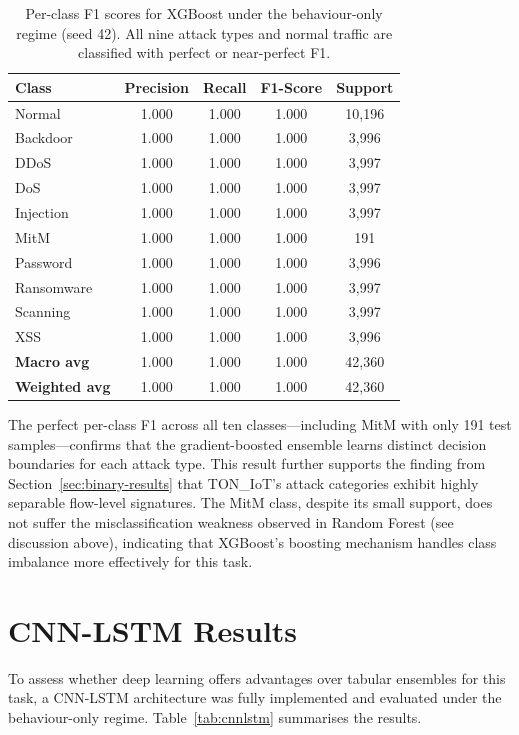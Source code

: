 \documentclass[12pt,a4paper]{report}
\begin{document}
\begin{table}[H]
\centering
\caption{Per-class F1 scores for XGBoost under the behaviour-only regime (seed 42). All nine attack types and normal traffic are classified with perfect or near-perfect F1.}
\label{tab:perclass-f1}
\begin{tabular}{lcccc}
\toprule
\textbf{Class} & \textbf{Precision} & \textbf{Recall} & \textbf{F1-Score} & \textbf{Support} \\
\midrule
Normal & 1.000 & 1.000 & 1.000 & 10,196 \\
Backdoor & 1.000 & 1.000 & 1.000 & 3,996 \\
DDoS & 1.000 & 1.000 & 1.000 & 3,997 \\
DoS & 1.000 & 1.000 & 1.000 & 3,997 \\
Injection & 1.000 & 1.000 & 1.000 & 3,997 \\
MitM & 1.000 & 1.000 & 1.000 & 191 \\
Password & 1.000 & 1.000 & 1.000 & 3,996 \\
Ransomware & 1.000 & 1.000 & 1.000 & 3,997 \\
Scanning & 1.000 & 1.000 & 1.000 & 3,997 \\
XSS & 1.000 & 1.000 & 1.000 & 3,996 \\
\midrule
\textbf{Macro avg} & 1.000 & 1.000 & 1.000 & 42,360 \\
\textbf{Weighted avg} & 1.000 & 1.000 & 1.000 & 42,360 \\
\bottomrule
\end{tabular}
\end{table}

The perfect per-class F1 across all ten classes---including MitM with only 191 test samples---confirms that the gradient-boosted ensemble learns distinct decision boundaries for each attack type. This result further supports the finding from Section~\ref{sec:binary-results} that TON\_IoT's attack categories exhibit highly separable flow-level signatures. The MitM class, despite its small support, does not suffer the misclassification weakness observed in Random Forest (see discussion above), indicating that XGBoost's boosting mechanism handles class imbalance more effectively for this task.

\section{CNN-LSTM Results}
\label{sec:cnnlstm-results}

To assess whether deep learning offers advantages over tabular ensembles for this task, a CNN-LSTM architecture was fully implemented and evaluated under the behaviour-only regime. Table~\ref{tab:cnnlstm} summarises the results.
\end{document}
